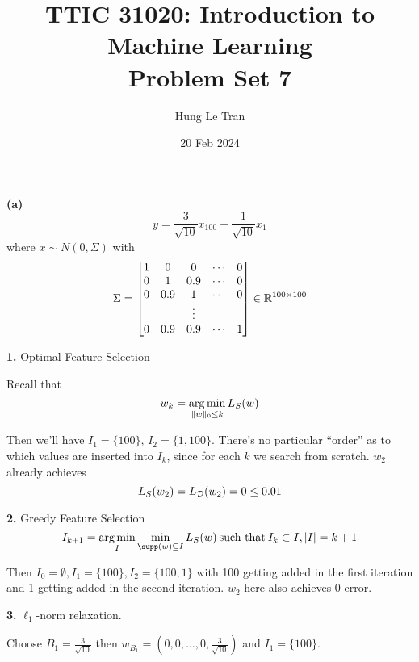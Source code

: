 \documentclass[a4paper, 10pt]{article}
\title{TTIC 31020: Introduction to Machine Learning \\ \large Problem Set 7}
\date{20 Feb 2024}
\author{Hung Le Tran}
\begin{document}
\maketitle
\setcounter{section}{7}
\begin{problem} [Problem 1]
    \textbf{(a)} \begin{equation*}
    y = \frac{3}{\sqrt{10}} x_{100} + \frac{1}{\sqrt{10}} x_1
    \end{equation*}
    where $x \sim N(0, \Sigma)$  with \begin{equation*}
    \Sigma = \begin{bmatrix}
    1 & 0 & 0 & \cdots & 0 \\
    0 & 1 & 0.9 & \cdots & 0 \\
    0 & 0.9 & 1 & \cdots & 0 \\
    &&\vdots &&\\
    0 & 0.9 & 0.9 & \cdots & 1
    \end{bmatrix} \in \mathbb{R}^{100 \times 100}
    \end{equation*}

    \textbf{1.} Optimal Feature Selection

    Recall that \begin{equation*}
    w_k = \operatorname*{arg\,min}_{\lVert w\rVert_0 \leq k} L_S(w)
    \end{equation*}

    Then we'll have $I_1 = \{100\}$, $I_2 = \{1, 100\}$. There's no particular ``order'' as to which values are inserted into $I_k$, since for each $k$ we search from scratch. $w_2$ already achieves \begin{equation*}
    L_S(w_2) = L_{\mathcal{D}}(w_2) = 0 \leq 0.01   
    \end{equation*}

    \textbf{2.} Greedy Feature Selection
    \begin{equation*}
        I_{k + 1} = \argmin_{I} \min_{\supp(w) \subseteq I} L_S(w) \:\text{such that}\:  I_k \subset I, \abs{I} = k+1
    \end{equation*}

    Then $I_0 = \emptyset, I_1  = \{100\}, I_2 = \{100, 1\}$ with 100 getting added in the first iteration and 1 getting added in the second iteration. $w_2$ here also achieves 0 error.

    \textbf{3.} $\ell_1$-norm relaxation.

    Choose $B_1 = \frac{3}{\sqrt{10}}$ then $w_{B_1} = (0, 0, \ldots, 0, \frac{3}{\sqrt{10}})$ and $I_1 = \{100\}$.


\end{problem}
\end{document}

